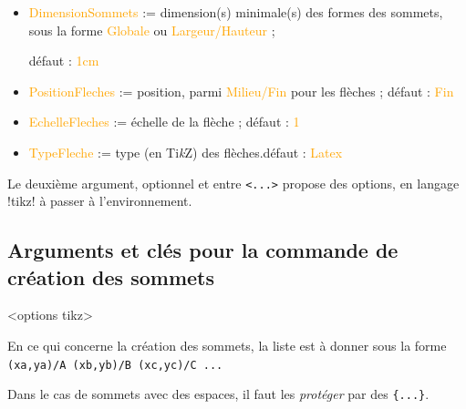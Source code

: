 \documentclass[french,a4paper,11pt]{article}
\providecommand\tikzlogo{Ti\textit{k}Z}
\let\TikZ\tikzlogo
\newcommand\Cle[1]{{\small\sffamily\textlangle \textcolor{orange}{#1}\textrangle}}
\begin{document}
{{\begin{tipblock}
\begin{itemize}
	\hfill~défaut : \Cle{vide}
	\item \Cle{DimensionSommets} := dimension(s) minimale(s) des formes des sommets, sous la forme \Cle{Globale} ou \Cle{Largeur/Hauteur} ;

	\hfill{}défaut : \Cle{1cm}
	\item \Cle{PositionFleches} := position, parmi \Cle{Milieu/Fin} pour les flèches ; \hfill{}défaut : \Cle{Fin}
	\item \Cle{EchelleFleches} := échelle de la flèche ; \hfill{}défaut : \Cle{1}
	\item \Cle{TypeFleche} := type (en \TikZ) des flèches.\hfill{}défaut : \Cle{Latex}
\end{itemize}

Le deuxième argument, optionnel et entre \texttt{<...>} propose des options, en langage \packagetex!tikz! à passer à l'environnement.
\end{tipblock}

\pagebreak

\subsection{Arguments et clés pour la commande de création des sommets}

\begin{DemoCode}
\begin{GrapheTikz}[clés]<options tikz>
\end{GrapheTikz}
\end{DemoCode}

\begin{tipblock}
En ce qui concerne la création des sommets, la liste est à donner sous la forme \verb!(xa,ya)/A (xb,yb)/B (xc,yc)/C ...!

\smallskip

Dans le cas de sommets avec des espaces, il faut les \textit{protéger} par des \texttt{\{...\}}.
\end{tipblock}

\begin{DemoCode}[]
\begin{GrapheTikz}[CouleurSommets={brown/purple},TypeSommets=ellipse,Police={}]
\end{GrapheTikz}
\end{DemoCode}

\begin{DemoCode}[]
\begin{GrapheTikz}[Epaisseur={very thick},Grille={5,4},DimensionSommets=1.5cm]
\end{GrapheTikz}
\end{DemoCode}

}}
\end{document}
